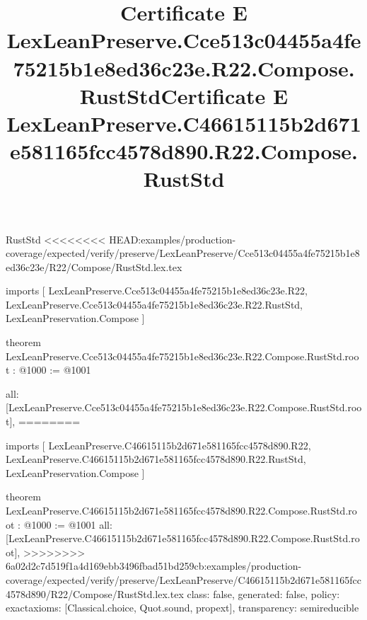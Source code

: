\begin{lexlean}{RustStd}
<<<<<<<< HEAD:examples/production-coverage/expected/verify/preserve/LexLeanPreserve/Cce513c04455a4fe75215b1e8ed36c23e/R22/Compose/RustStd.lex.tex
\title{Certificate E LexLeanPreserve.Cce513c04455a4fe75215b1e8ed36c23e.R22.Compose.RustStd}
\begin{coremodule}
imports [
  LexLeanPreserve.Cce513c04455a4fe75215b1e8ed36c23e.R22,
  LexLeanPreserve.Cce513c04455a4fe75215b1e8ed36c23e.R22.RustStd,
  LexLeanPreservation.Compose
]

theorem LexLeanPreserve.Cce513c04455a4fe75215b1e8ed36c23e.R22.Compose.RustStd.root : @1000 := @1001 {
  all: [LexLeanPreserve.Cce513c04455a4fe75215b1e8ed36c23e.R22.Compose.RustStd.root],
========
\title{Certificate E LexLeanPreserve.C46615115b2d671e581165fcc4578d890.R22.Compose.RustStd}
\begin{coremodule}
imports [
  LexLeanPreserve.C46615115b2d671e581165fcc4578d890.R22,
  LexLeanPreserve.C46615115b2d671e581165fcc4578d890.R22.RustStd,
  LexLeanPreservation.Compose
]

theorem LexLeanPreserve.C46615115b2d671e581165fcc4578d890.R22.Compose.RustStd.root : @1000 := @1001 {
  all: [LexLeanPreserve.C46615115b2d671e581165fcc4578d890.R22.Compose.RustStd.root],
>>>>>>>> 6a02d2c7d519f1a4d169ebb3496fbad51bd259cb:examples/production-coverage/expected/verify/preserve/LexLeanPreserve/C46615115b2d671e581165fcc4578d890/R22/Compose/RustStd.lex.tex
  class: false,
  generated: false,
  policy: exact{axioms: [Classical.choice, Quot.sound, propext]},
  transparency: semireducible
}


\end{coremodule}}
\end{coremodule}
\end{lexlean}
